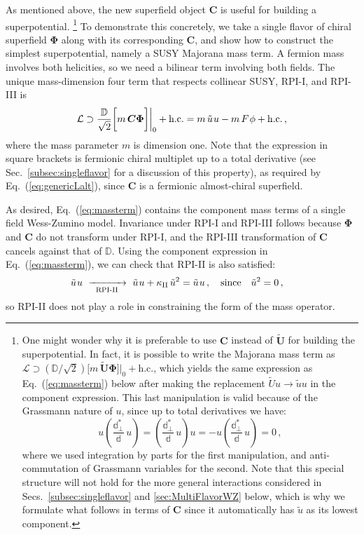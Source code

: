 \documentclass[12pt,document,nofootinbib,superscriptaddress,onecolumn,preprintnumbers,balancelastpage]{article}
\newcommand{\rpiii}{{\kappa_\text{II}}}
\newcommand{\s}{\hspace{0.8pt}}
\newcommand{\PP}{\mathbb{d}}
\newcommand{\RPIii}{\,\,\xrightarrow[\hspace{5pt}\text{RPI-II}\hspace{5pt}]{}\,\,}
\DeclareRobustCommand{\Sec}[1]{Sec.~\ref{#1}}
\DeclareRobustCommand{\Secs}[2]{Secs.~\ref{#1} and \ref{#2}}
\DeclareRobustCommand{\Eq}[1]{Eq.~(\ref{#1})}
\newcommand{\bPhi}{ \boldsymbol \Phi}
\newcommand{\bC}{ \boldsymbol C}
\newcommand{\bU}{ \tilde{\boldsymbol U}}
\newcommand{\D}{\mathbb{D}}
\newcommand{\uu}{\tilde u}
\begin{document}
\begin{spacing}{1.2}
As mentioned above, the new superfield object $\bC$ is useful for building a superpotential.%
%
\footnote{One might wonder why it is preferable to use $\bC$ instead of $\bU$ for building the superpotential.   In fact, it is possible to write the Majorana mass term as $\mathcal{L} \supset (\D/\sqrt{2}) \big[m\,\bU \bPhi\big]\big|_0 + \text{h.c.}$, which yields the same expression as \Eq{eq:massterm} below after making the replacement $\tilde{U} u \to \uu u$ in the component expression.  This last manipulation is valid because of the Grassmann nature of $u$, since up to total derivatives we have:
%
\begin{equation}
u \left(\frac{\PP_\perp^*}{  \PP}\, u \right) = \left(\frac{\PP_\perp^*}{  \PP}\, u \right) u = - u \left(\frac{\PP_\perp^*}{  \PP}\, u \right) = 0\,,
\end{equation}
%
where we used integration by parts for the first manipulation, and anti-commutation of Grassmann variables for the second.
%
Note that this special structure will not hold for the more general interactions considered in \Secs{subsec:singleflavor}{sec:MultiFlavorWZ} below, which is why we formulate what follows in terms of $\bC$ since it automatically has $\uu$ as its lowest component.
}
%
To demonstrate this concretely, we take a single flavor of chiral superfield $\bPhi$ along with its corresponding $\bC$, and show how to construct the simplest superpotential, namely a SUSY Majorana mass term.
%
A fermion mass involves both helicities, so we need a bilinear term involving both fields.
%
The unique mass-dimension four term that respects collinear SUSY, RPI-I, and RPI-III is 
%
\begin{align}
\mathcal{L}  \supset   \frac{\D}{\sqrt{2}}  \bigg[m \, \bC  \bPhi \bigg] \bigg|_{0} + \text{h.c.} = m \, \uu\s u   -  m\, F\s \phi + \text{h.c.}  \, ,
\label{eq:massterm}
\end{align}
%
where the mass parameter $m$ is dimension one.
%
Note that the expression in square brackets is fermionic chiral multiplet up to a total derivative (see \Sec{subsec:singleflavor} for a discussion of this property), as required by \Eq{eq:genericLalt}, since $\bC$ is a fermionic almost-chiral superfield.  

As desired, \Eq{eq:massterm} contains the component mass terms of a single field Wess-Zumino model.
%
Invariance under RPI-I and RPI-III follows because $\bPhi$ and $\bC$ do not transform under RPI-I, and the RPI-III transformation of $\bC$ cancels against that of $\D$. 
%
Using the component expression in \Eq{eq:massterm}, we can check that RPI-II is also satisfied:
%
\begin{align}
\label{eq:RPIiiofuu}
& \uu\s u \RPIii \uu\s u + \rpiii \,\uu^2 = \uu\s u \, , \quad \text{since} \quad \uu^2 = 0  \, ,
\end{align}
%
so RPI-II does not play a role in constraining the form of the mass operator.


\end{spacing}
\end{document}
